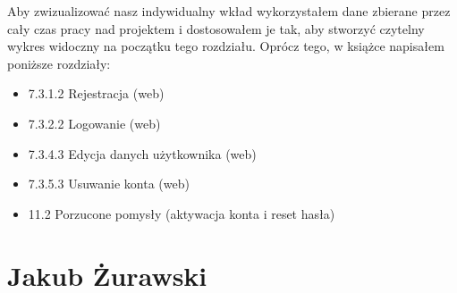 Aby zwizualizować nasz indywidualny wkład wykorzystałem dane zbierane przez cały czas pracy nad projektem i
dostosowałem je tak, aby stworzyć czytelny wykres widoczny na początku tego rozdziału.
Oprócz tego, w książce napisałem poniższe rozdziały:

\begin{itemize}
    \item 7.3.1.2 Rejestracja (web)
    \item 7.3.2.2 Logowanie (web)
    \item 7.3.4.3 Edycja danych użytkownika (web)
    \item 7.3.5.3 Usuwanie konta (web)
    \item 11.2 Porzucone pomysły (aktywacja konta i reset hasła)
\end{itemize}

\section{Jakub Żurawski}

